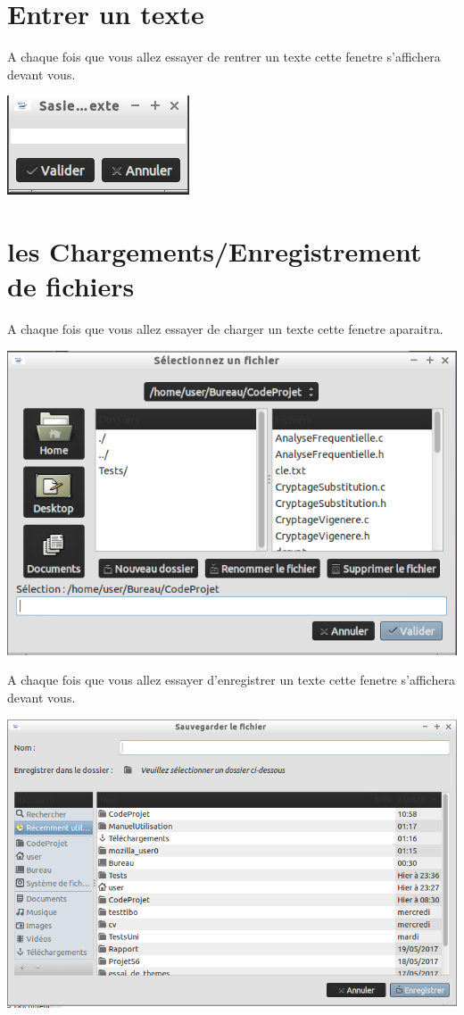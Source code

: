 \documentclass[a4]{article}
\begin{document}
	\section{Entrer un texte}
		A chaque fois que vous allez essayer de rentrer un texte cette fenetre s'affichera devant vous.
		\begin{center}\includegraphics[scale=0.4]{21.png}\end{center}
	\section{les Chargements/Enregistrement de fichiers}
		A chaque fois que vous allez essayer de charger un texte cette fenetre aparaitra.			
		\begin{center}\includegraphics[scale=0.4]{19.png}\end{center}
		A chaque fois que vous allez essayer d'enregistrer un texte cette fenetre s'affichera devant vous.

		\begin{center}\includegraphics[scale=0.4]{20.png}\end{center}
\end{document}
